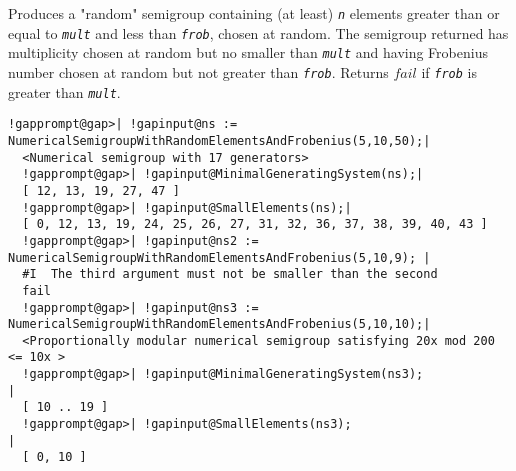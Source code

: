 \documentclass[a4paper,11pt]{report}
\begin{document}
{{{ Produces a "random" semigroup containing (at least) \mbox{\texttt{\mdseries\slshape n}} elements greater than or equal to \mbox{\texttt{\mdseries\slshape mult}} and less than \mbox{\texttt{\mdseries\slshape frob}}, chosen at random. The semigroup returned has multiplicity chosen at random
but no smaller than \mbox{\texttt{\mdseries\slshape mult}} and having Frobenius number chosen at random but not greater than \mbox{\texttt{\mdseries\slshape frob}}. Returns $fail$ if \mbox{\texttt{\mdseries\slshape frob}} is greater than \mbox{\texttt{\mdseries\slshape mult}}. 
\begin{Verbatim}[commandchars=!@|,fontsize=\small,frame=single,label=Example]
  !gapprompt@gap>| !gapinput@ns := NumericalSemigroupWithRandomElementsAndFrobenius(5,10,50);|
  <Numerical semigroup with 17 generators>
  !gapprompt@gap>| !gapinput@MinimalGeneratingSystem(ns);|
  [ 12, 13, 19, 27, 47 ]
  !gapprompt@gap>| !gapinput@SmallElements(ns);|
  [ 0, 12, 13, 19, 24, 25, 26, 27, 31, 32, 36, 37, 38, 39, 40, 43 ]
  !gapprompt@gap>| !gapinput@ns2 := NumericalSemigroupWithRandomElementsAndFrobenius(5,10,9); |
  #I  The third argument must not be smaller than the second
  fail
  !gapprompt@gap>| !gapinput@ns3 := NumericalSemigroupWithRandomElementsAndFrobenius(5,10,10);|
  <Proportionally modular numerical semigroup satisfying 20x mod 200 <= 10x >
  !gapprompt@gap>| !gapinput@MinimalGeneratingSystem(ns3);                                    |
  [ 10 .. 19 ]
  !gapprompt@gap>| !gapinput@SmallElements(ns3);                                              |
  [ 0, 10 ]
\end{Verbatim}
 }

 }

 }
\end{document}

